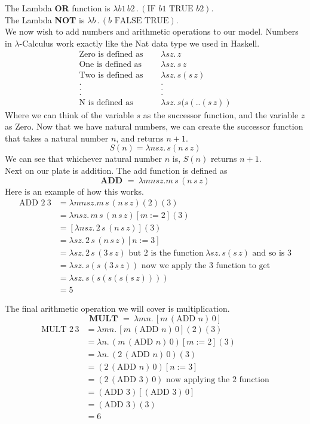 \documentclass[12pt]{article}
\begin{document}
\begin{enumerate}
The Lambda \textbf{OR} function is $\lambda b1\,b2\,.\,(\text{IF }b1\text{ TRUE }b2)$.\\
The Lambda \textbf{NOT} is $\lambda b\,.\,(b\text{ FALSE }\text{TRUE})$.\\
\newline
We now wish to add numbers and arithmetic operations to our model. Numbers in $\lambda$-Calculus work exactly like the Nat data type we used in Haskell. 
\begin{align*}
\text{Zero is defined as }\quad &\lambda sz.\,z\\
\text{One is defined as }\quad &\lambda sz .\, s\,z\\
\text{Two is defined as }\quad &\lambda sz. \, s(s\,z)\\
.\ \quad&.\\
.\ \quad&.\\
.\ \quad&.\\
\text{N is defined as }\quad &\lambda sz.\, s(s(..(s\, z))
\end{align*}
Where we can think of the variable $s$ as the successor function, and the variable $z$ as Zero. Now that we have natural numbers, we can create the successor function that takes a natural number $n$, and returns $n+1$. $$S(n) = \lambda nsz.\,s(n\,s\,z)$$
We can see that whichever natural number $n$ is, $S(n)$ returns $n+1$. \\
Next on our plate is addition. The add function is defined as 
$$\textbf{ADD } = \ \lambda mnsz. m\,s\,(n\, s\, z)$$
Here is an example of how this works. 
\begin{align*}
\text{ADD } 2\ 3 &= \lambda mnsz. m\,s\,(n\, s\, z)(2)(3)\\
&= \lambda nsz.\,m\,s\,(n\,s\,z)[m:=2](3)\\
&= [\lambda nsz.\,2\,s\,(n\,s\,z)](3)\\
&= \lambda sz.\,2\,s\,(n\,s\,z)[n:=3]\\
&= \lambda sz.\,2\,s\,(3\,s\,z)\text{ but 2 is the function}\ \lambda sz. \, s(s\,z)\text{ and so is 3}\\
&= \lambda sz.\, s(s\,(3\,s\,z))\text{ now we apply the 3 function to get}\\
&= \lambda sz.\, s(s(s(s(s\,z))))\\
&= 5
\end{align*}

The final arithmetic operation we will cover is multiplication.
$$\textbf{MULT } = \ \lambda mn.\, [m\, (\text{ADD } n)\, 0]$$
\begin{align*}
    \text{MULT }2\,3 &=\lambda mn.\, [m\, (\text{ADD } n)\, 0](2)(3)\\
    &= \lambda n.\, (m\, (\text{ADD } n)\, 0)[m:=2](3)\\
    &= \lambda n.\, (2\, (\text{ADD } n)\, 0)(3)\\
    &= (2\,(\text{ADD } n)\, 0)[n:=3]\\
    &= (2\,(\text{ADD } 3)\, 0)\text{ now applying the 2 function}\\
    &= (\text{ADD } 3)[(\text{ADD } 3)\,0]\\
    &= (\text{ADD } 3)(3)\\
    &= 6
\end{align*}



\end{enumerate}
\end{document}
